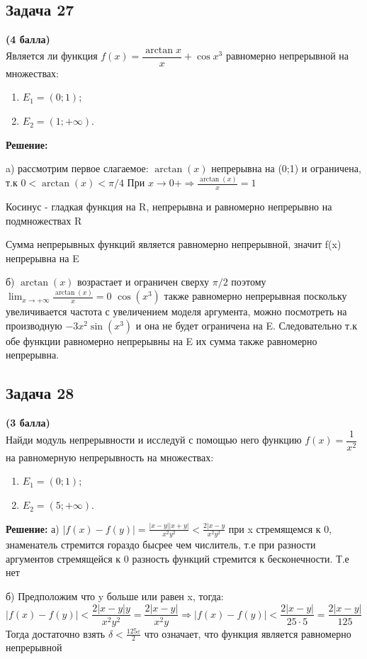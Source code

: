 \documentclass[a4paper,12pt]{article}
\begin{document}
\subsection{Задача 27}
\textbf{(4 балла)} \\
Является ли функция $f(x) = \dfrac{\arctan x}{x}+ \cos x^3$ равномерно непрерывной на множествах:
\begin{enumerate}[label=\alph*)]
    \item $E_1 = (0; 1)$;
    \item $E_2 = (1; +\infty)$.
\end{enumerate}
\textbf{Решение:}

a)
рассмотрим первое слагаемое: $\arctan(x)$ непрерывна на (0;1) и ограничена, т.к $0 < \arctan(x) < \pi/4$ При $x \to 0+ \Rightarrow \frac{\arctan(x)}{x} = 1$ 

Косинус - гладкая функция на R, непрерывна и равномерно непрерывно на подмножествах R

Сумма непрерывных функций является равномерно непрерывной, значит f(x) непрерывна на E

б)
$\arctan(x)$ возрастает и ограничен сверху $\pi/2$ поэтому $\lim_{x \to +\infty}\frac{\arctan(x)}{x}=0$
$\cos(x^3)$ также равномерно непрерывная поскольку увеличивается частота с увеличением моделя аргумента,  можно посмотреть на производную $-3x^2\sin(x^3)$ и она не будет ограничена на E. Следовательно т.к обе функции равномерно непрерывны на E их сумма также равномерно непрерывна.


\subsection{Задача 28}
\textbf{(3 балла)} \\
Найди модуль непрерывности и исследуй с помощью него функцию $f(x) = \dfrac{1}{x^2}$ на равномерную непрерывность на множествах:
\begin{enumerate}[label=\alph*)]
    \item $E_1 = (0; 1)$;
    \item $E_2 = (5; +\infty)$.
\end{enumerate}
\textbf{Решение:}
а) $|f(x)-f(y)|=\frac{|x-y||x+y|}{x^2y^2}<\frac{2|x-y}{x^2y^2}$ при x стремящемся к 0, знаменатель стремится гораздо бысрее чем числитель, т.е при разности аргументов стремящейся к 0 разность функций стремится к бесконечности. Т.е нет

б) Предположим что y больше или равен x, тогда: $     |f(x) - f(y)| < \dfrac{2|x - y|y}{x^2 y^2} = \dfrac{2|x - y|}{x^2 y} \Longrightarrow    |f(x) - f(y)| < \dfrac{2|x - y|}{25 \cdot 5} = \dfrac{2|x - y|}{125}$ Тогда достаточно взять $\delta < \frac{125\varepsilon}{2}$ что означает, что функция является равномерно непрерывной
\end{document}

